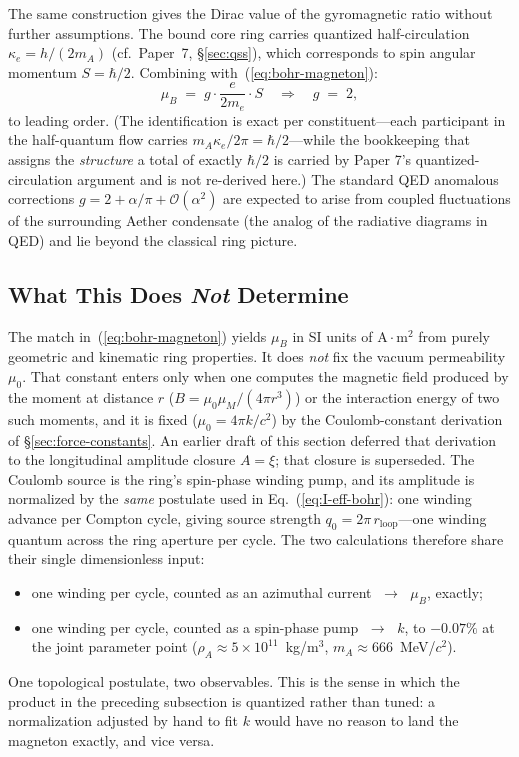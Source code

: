 The same construction gives the Dirac value of the gyromagnetic ratio
without further assumptions. The bound core ring carries
quantized half-circulation $\kappa_e = h/(2 m_A)$
(cf.\ Paper~7, §\ref{sec:qss}), which corresponds to spin angular
momentum $S = \hbar/2$. Combining with~(\ref{eq:bohr-magneton}):
\begin{equation}
\mu_B \;=\; g\cdot\frac{e}{2 m_e}\cdot S \quad\Longrightarrow\quad
g \;=\; 2,
\end{equation}
to leading order. (The identification is exact per constituent---each
participant in the half-quantum flow carries
$m_A \kappa_e/2\pi = \hbar/2$---while the bookkeeping that assigns the
\emph{structure} a total of exactly $\hbar/2$ is carried by Paper 7's
quantized-circulation argument and is not re-derived here.) The
standard QED anomalous corrections
$g = 2 + \alpha/\pi + \mathcal O(\alpha^2)$ are expected to arise from
coupled fluctuations of the surrounding Aether condensate (the analog of
the radiative diagrams in QED) and lie beyond the classical ring
picture.

\subsection{What This Does \emph{Not} Determine}

The match in~(\ref{eq:bohr-magneton}) yields $\mu_B$ in SI units of
$\mathrm{A\cdot m^2}$ from purely geometric and kinematic ring
properties. It does \emph{not} fix the vacuum permeability $\mu_0$.
That constant enters only when one computes the magnetic field
produced by the moment at distance $r$
($B = \mu_0\mu_M/(4\pi r^3)$) or the interaction energy of two such
moments, and it is fixed ($\mu_0 = 4\pi k/c^2$) by the
Coulomb-constant derivation of §\ref{sec:force-constants}. An earlier
draft of this section deferred that derivation to the longitudinal
amplitude closure $A = \xi$; that closure is superseded. The Coulomb
source is the ring's spin-phase winding pump, and its amplitude is
normalized by the \emph{same} postulate used in
Eq.~(\ref{eq:I-eff-bohr}): one winding advance per Compton cycle,
giving source strength $q_0 = 2\pi\,r_{\text{loop}}$---one winding
quantum across the ring aperture per cycle. The two calculations
therefore share their single dimensionless input:
\begin{itemize}
\item one winding per cycle, counted as an azimuthal current
  $\;\rightarrow\;$ $\mu_B$, exactly;
\item one winding per cycle, counted as a spin-phase pump
  $\;\rightarrow\;$ $k$, to $-0.07\%$ at the joint parameter point
  ($\rho_A \approx 5\times10^{11}$~kg/m$^3$,
  $m_A \approx 666$~MeV/$c^2$).
\end{itemize}
One topological postulate, two observables. This is the sense in which
the product in the preceding subsection is quantized rather than
tuned: a normalization adjusted by hand to fit $k$ would have no reason
to land the magneton exactly, and vice versa.

